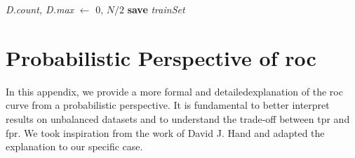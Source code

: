 \begin{appendices}
\begin{algorithm}
        \textit{D.count, D.max} $\gets$ $0, \,N/2$\;
        \textbf{save} \textit{trainSet}\;
    \end{algorithm}

\chapter{Probabilistic Perspective of \ac{roc}}
In this appendix, we provide a more formal and detailedexplanation of the \ac{roc} curve 
from a probabilistic perspective. It is fundamental to better interpret results on 
unbalanced datasets and to understand the trade-off between \ac{tpr} and \ac{fpr}.
We took inspiration from the work of David J. Hand \cite{roc_auc_probabilistic} 
and adapted the explanation to our specific case.


\end{appendices}
